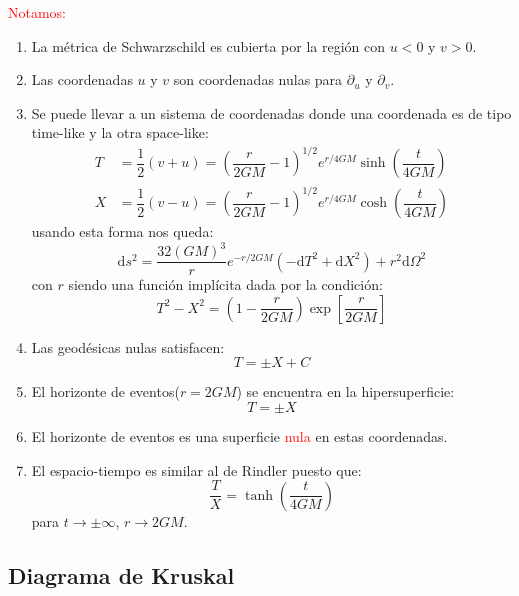 \documentclass[../main]{subfiles}
\begin{document}
\textcolor{red}{Notamos:}
\begin{enumerate}
    \item La métrica de Schwarzschild es cubierta por la región con $u<0$ y $v>0$.
    \item Las coordenadas $u$ y $v$ son coordenadas nulas para $\partial_u$ y $\partial_v$.
    \item Se puede llevar a un sistema de coordenadas donde una coordenada es de tipo time-like y la otra space-like:
    \begin{align}
        T&=\dfrac{1}{2}(v+u)=\left(\dfrac{r}{2GM}-1\right)^{1/2}e^{r/4GM}\sinh\left(\dfrac{t}{4GM}\right)\\
        X&=\dfrac{1}{2}(v-u)=\left(\dfrac{r}{2GM}-1\right)^{1/2}e^{r/4GM}\cosh\left(\dfrac{t}{4GM}\right)
    \end{align}
    usando esta forma nos queda:
    \begin{equation}
        \mathrm{d}s^2=\dfrac{32(GM)^3}{r}e^{-r/2GM}(-\mathrm{d}T^2+\mathrm{d}X^2)+r^2\mathrm{d}\Omega^2
    \end{equation}
    con $r$ siendo una función implícita dada por la condición:
    \begin{equation}
        T^2-X^2=\left(1-\dfrac{r}{2GM}\right)\exp\left[\dfrac{r}{2GM}\right]
    \end{equation}
    \item Las geodésicas nulas satisfacen:
    \begin{equation}
        T=\pm X+C
    \end{equation}
    \item El horizonte de eventos($r=2GM$) se encuentra en la hipersuperficie:
    \begin{equation}
        T=\pm X
    \end{equation}
    \item El horizonte de eventos es una superficie \textcolor{red}{nula} en estas coordenadas.
    \item El espacio-tiempo es similar al de Rindler puesto que:
    \begin{equation}
        \dfrac{T}{X}=\tanh\left(\dfrac{t}{4GM}\right)
    \end{equation}
    para $t\rightarrow \pm \infty$, $r \rightarrow 2GM$.
\end{enumerate}

\subsection{Diagrama de Kruskal}
\end{document}
